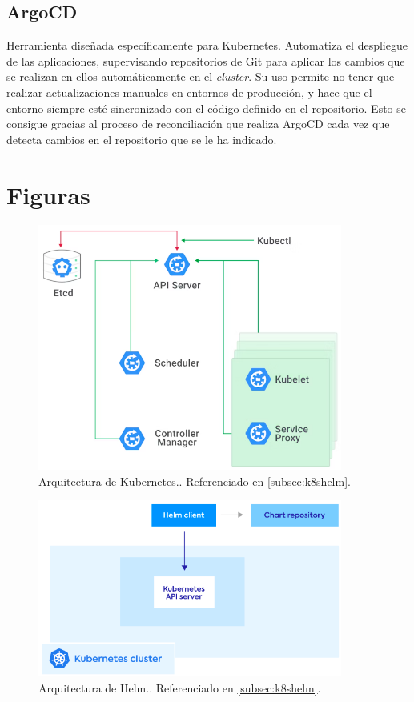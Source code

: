 \subsection*{ArgoCD}
\label{tech:argocd}

Herramienta diseñada específicamente para Kubernetes. Automatiza el despliegue de las aplicaciones, supervisando repositorios de Git para aplicar los cambios que se realizan en ellos automáticamente en el \textit{cluster}. Su uso permite no tener que realizar actualizaciones manuales en entornos de producción, y hace que el entorno siempre esté sincronizado con el código definido en el repositorio. Esto se consigue gracias al proceso de reconciliación que realiza ArgoCD cada vez que detecta cambios en el repositorio que se le ha indicado.

\clearpage

\section{Figuras}

\begin{figure}[h]
  \centerline{\includegraphics[width=10cm]{figuras/k8s}}
  \caption{Arquitectura de Kubernetes.\cite{img:k8s}. Referenciado en \ref{subsec:k8shelm}.}
  \label{fig:k8s}
\end{figure}

\begin{figure}[h]
  \centerline{\includegraphics[width=10cm]{figuras/helm}}
  \caption{Arquitectura de Helm.\cite{img:helm}. Referenciado en \ref{subsec:k8shelm}.}
  \label{fig:helm}
\end{figure}


